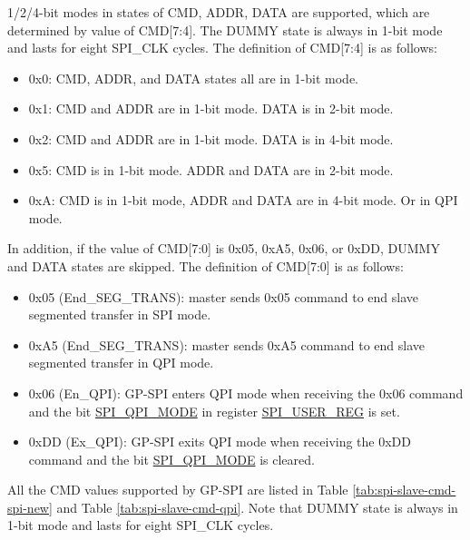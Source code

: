 \documentclass[main\_\_EN.tex]{subfiles}
\begin{document}
1/2/4-bit modes in states of CMD, ADDR, DATA are supported, which are determined by value of CMD[7:4]. The DUMMY state is always in 1-bit mode and lasts for eight SPI\_CLK cycles. The definition of CMD[7:4] is as follows:

\begin{itemize}
    \item 0x{}0: CMD, ADDR, and DATA states all are in 1-bit mode.
    \item 0x{}1: CMD and ADDR are in 1-bit mode. DATA is in 2-bit mode.
    \item 0x{}2: CMD and ADDR are in 1-bit mode. DATA is in 4-bit mode.
    \item 0x{}5: CMD is in 1-bit mode. ADDR and DATA are in 2-bit mode.
    \item 0x{}A: CMD is in 1-bit mode, ADDR and DATA are in 4-bit mode. Or in QPI mode.
\end{itemize}

In addition, if the value of CMD[7:0] is 0x{}05, 0x{}A5, 0x{}06, or 0x{}DD, DUMMY and DATA states are skipped. The definition of CMD[7:0] is as follows:

\begin{itemize}
    \item \label{cmd:ENDSEGTRANS}0x{}05 (End\_SEG\_TRANS): master sends 0x{}05 command to end slave segmented transfer in SPI mode.
    \item 0x{}A5 (End\_SEG\_TRANS): master sends 0x{}A5 command to end slave segmented transfer in QPI mode.
    \item 0x{}06 (En\_QPI): GP-SPI enters QPI mode when receiving the 0x{}06 command and the bit \hyperref[fielddesc:SPIQPIMODE]{SPI\_QPI\_MODE} in register \hyperref[regdesc:SPIUSERREG]{SPI\_USER\_REG} is set.
    \item 0x{}DD (Ex\_QPI): GP-SPI exits QPI mode when receiving the 0x{}DD command and the bit \hyperref[fielddesc:SPIQPIMODE]{SPI\_QPI\_MODE} is cleared.
\end{itemize}


All the CMD values supported by GP-SPI are listed in Table \ref{tab:spi-slave-cmd-spi-new} and Table \ref{tab:spi-slave-cmd-qpi}. Note that DUMMY state is always in 1-bit mode and lasts for eight SPI\_CLK cycles.
\end{document}
